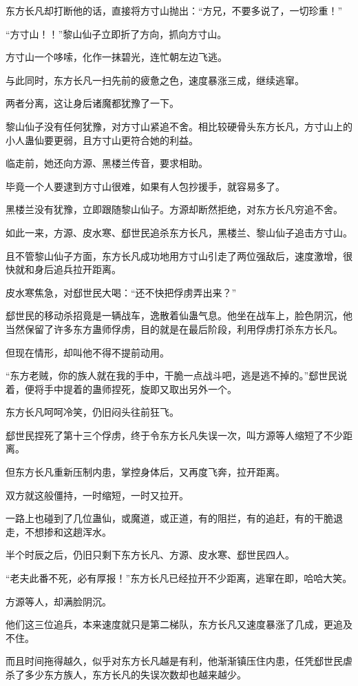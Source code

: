 \begin{this_body}
东方长凡却打断他的话，直接将方寸山抛出：“方兄，不要多说了，一切珍重！”

“方寸山！！”黎山仙子立即折了方向，抓向方寸山。

方寸山一个哆嗦，化作一抹碧光，连忙朝左边飞逃。

与此同时，东方长凡一扫先前的疲惫之色，速度暴涨三成，继续逃窜。

两者分离，这让身后诸魔都犹豫了一下。

黎山仙子没有任何犹豫，对方寸山紧追不舍。相比较硬骨头东方长凡，方寸山上的小人蛊仙要更弱，且方寸山更符合她的利益。

临走前，她还向方源、黑楼兰传音，要求相助。

毕竟一个人要逮到方寸山很难，如果有人包抄援手，就容易多了。

黑楼兰没有犹豫，立即跟随黎山仙子。方源却断然拒绝，对东方长凡穷追不舍。

如此一来，方源、皮水寒、郄世民追杀东方长凡，黑楼兰、黎山仙子追击方寸山。

且不管黎山仙子方面，东方长凡成功地用方寸山引走了两位强敌后，速度激增，很快就和身后追兵拉开距离。

皮水寒焦急，对郄世民大喝：“还不快把俘虏弄出来？”

郄世民的移动杀招竟是一辆战车，逸散着仙蛊气息。他坐在战车上，脸色阴沉，他当然保留了许多东方蛊师俘虏，目的就是在最后阶段，利用俘虏打杀东方长凡。

但现在情形，却叫他不得不提前动用。

“东方老贼，你的族人就在我的手中，干脆一点战斗吧，逃是逃不掉的。”郄世民说着，便将手中提着的蛊师捏死，旋即又取出另外一个。

东方长凡呵呵冷笑，仍旧闷头往前狂飞。

郄世民捏死了第十三个俘虏，终于令东方长凡失误一次，叫方源等人缩短了不少距离。

但东方长凡重新压制内患，掌控身体后，又再度飞奔，拉开距离。

双方就这般僵持，一时缩短，一时又拉开。

一路上也碰到了几位蛊仙，或魔道，或正道，有的阻拦，有的追赶，有的干脆退走，不想掺和这趟浑水。

半个时辰之后，仍旧只剩下东方长凡、方源、皮水寒、郄世民四人。

“老夫此番不死，必有厚报！”东方长凡已经拉开不少距离，逃窜在即，哈哈大笑。

方源等人，却满脸阴沉。

他们这三位追兵，本来速度就只是第二梯队，东方长凡又速度暴涨了几成，更追及不住。

而且时间拖得越久，似乎对东方长凡越是有利，他渐渐镇压住内患，任凭郄世民虐杀了多少东方族人，东方长凡的失误次数却也越来越少。


\end{this_body}
